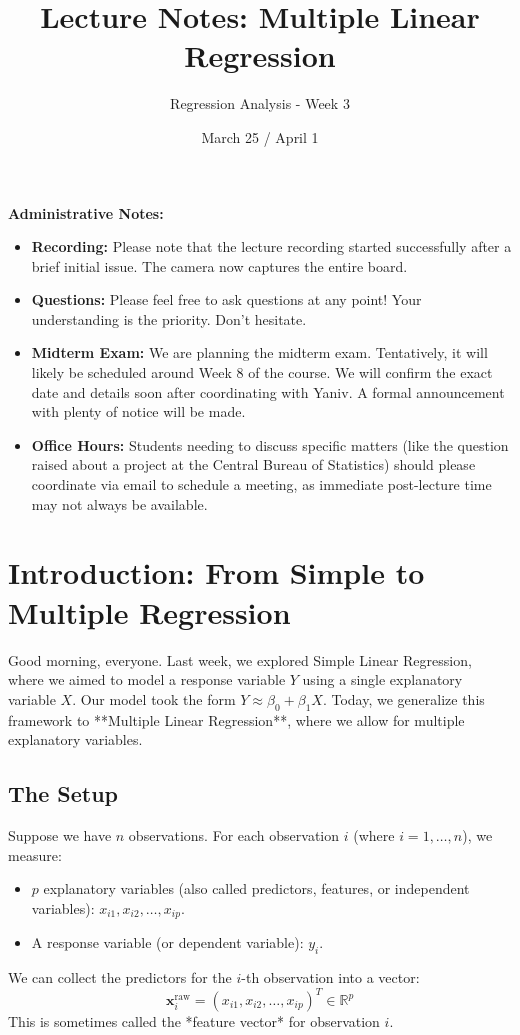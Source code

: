 \documentclass[11pt]{article}
\title{Lecture Notes: Multiple Linear Regression}
\author{Regression Analysis - Week 3}
\date{March 25 / April 1} %
\theoremstyle{definition}
\newenvironment{adminnote}
  {\par\medskip\noindent\begin{boxedminipage}{\textwidth}\textbf{Administrative Notes:}\medskip\par}
  {\end{boxedminipage}\par\medskip}
\newenvironment{boxedminipage}[1]
    {\begin{lrbox}{\mybox}\begin{minipage}{#1}}
    {\end{minipage}\end{lrbox}\fbox{\usebox{\mybox}}}
\newcommand{\R}{\mathbb{R}}
\newcommand{\T}{^T} %
\begin{document}
\maketitle

\begin{adminnote}
\begin{itemize}
    \item \textbf{Recording:} Please note that the lecture recording started successfully after a brief initial issue. The camera now captures the entire board.
    \item \textbf{Questions:} Please feel free to ask questions at any point! Your understanding is the priority. Don't hesitate.
    \item \textbf{Midterm Exam:} We are planning the midterm exam. Tentatively, it will likely be scheduled around Week 8 of the course. We will confirm the exact date and details soon after coordinating with Yaniv. A formal announcement with plenty of notice will be made.
    \item \textbf{Office Hours:} Students needing to discuss specific matters (like the question raised about a project at the Central Bureau of Statistics) should please coordinate via email to schedule a meeting, as immediate post-lecture time may not always be available.
\end{itemize}
\end{adminnote}

\section{Introduction: From Simple to Multiple Regression}

Good morning, everyone. Last week, we explored Simple Linear Regression, where we aimed to model a response variable $Y$ using a single explanatory variable $X$. Our model took the form $Y \approx \beta_0 + \beta_1 X$. Today, we generalize this framework to **Multiple Linear Regression**, where we allow for multiple explanatory variables.

\subsection{The Setup}

Suppose we have $n$ observations. For each observation $i$ (where $i = 1, \dots, n$), we measure:
\begin{itemize}
    \item $p$ explanatory variables (also called predictors, features, or independent variables): $x_{i1}, x_{i2}, \dots, x_{ip}$.
    \item A response variable (or dependent variable): $y_i$.
\end{itemize}
We can collect the predictors for the $i$-th observation into a vector:
\[ \mathbf{x}_i^{\text{raw}} = (x_{i1}, x_{i2}, \dots, x_{ip})\T \in \R^p \]
This is sometimes called the *feature vector* for observation $i$.
\end{document}
